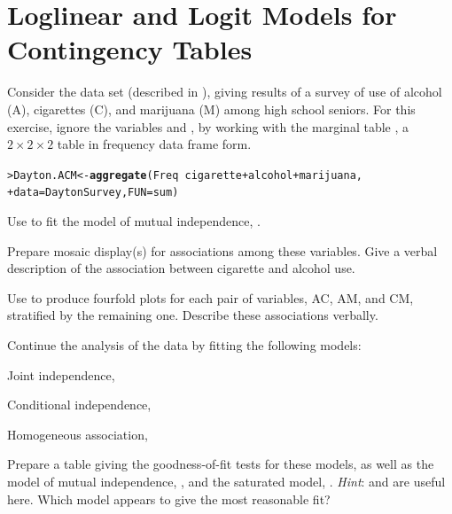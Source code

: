 \documentclass[11pt]{report}\usepackage[]{graphicx}\usepackage[]{color}
\makeatletter
\newcommand{\hlopt}[1]{\textcolor[rgb]{0,0,0}{#1}}%
\newcommand{\hlstd}[1]{\textcolor[rgb]{0.345,0.345,0.345}{#1}}%
\newcommand{\hlkwb}[1]{\textcolor[rgb]{0.69,0.353,0.396}{#1}}%
\newcommand{\hlkwc}[1]{\textcolor[rgb]{0.333,0.667,0.333}{#1}}%
\newcommand{\hlkwd}[1]{\textcolor[rgb]{0.737,0.353,0.396}{\textbf{#1}}}%
\newenvironment{kframe}{%
 \def\at@end@of@kframe{}%
 \ifinner\ifhmode%
  \def\at@end@of@kframe{\end{minipage}}%
  \begin{minipage}{\columnwidth}%
 \fi\fi%
 \def\FrameCommand##1{\hskip\@totalleftmargin \hskip-\fboxsep
 \colorbox{shadecolor}{##1}\hskip-\fboxsep
     \hskip-\linewidth \hskip-\@totalleftmargin \hskip\columnwidth}%
 \MakeFramed {\advance\hsize-\width
   \@totalleftmargin\z@ \linewidth\hsize
   \@setminipage}}%
 {\par\unskip\endMakeFramed%
 \at@end@of@kframe}
\newenvironment{knitrout}{}{} %
\renewenvironment{knitrout}{\small\renewcommand{\baselinestretch}{.85}}{} %
\makeatother
\begin{document}
\chapter{Loglinear and Logit Models for Contingency Tables}\label{ch:loglin}

\begin{Exercises}

  \exercise Consider the data set  (described in ), giving
  results of a survey of use of alcohol (A), cigarettes (C), and marijuana (M) among high school
  seniors.  For this exercise, ignore the variables  and , by working with the
  marginal table , a $2 \times 2 \times 2$ table in frequency data frame form.
\begin{knitrout}
\color{fgcolor}\begin{kframe}
\begin{alltt}
\hlstd{> }\hlstd{Dayton.ACM} \hlkwb{<-} \hlkwd{aggregate}\hlstd{(Freq} \hlopt{~} \hlstd{cigarette} \hlopt{+} \hlstd{alcohol} \hlopt{+} \hlstd{marijuana,}
\hlstd{+ }                        \hlkwc{data}\hlstd{=DaytonSurvey,} \hlkwc{FUN}\hlstd{=sum)}
\end{alltt}
\end{kframe}
\end{knitrout}
  \begin{enumerate*}
    \item Use  to fit the model of mutual independence, .
    \item Prepare mosaic display(s) for associations among these variables.
    Give a verbal description of the association between cigarette and alcohol use.
    \item Use  to produce fourfold plots for each pair of variables,
    AC, AM, and CM, stratified by the remaining one.
    Describe these associations verbally.
  \end{enumerate*}
  
  \exercise Continue the analysis of the  data by fitting the following models:
  \begin{enumerate*}
    \item Joint independence, 
    \item Conditional independence, 
    \item Homogeneous association, 
    \item Prepare a table giving the goodness-of-fit tests for these models, as well as the
    model of mutual independence, , and the saturated model, .
    \emph{Hint}:  and  are useful here.
    Which model appears to give the most reasonable fit?
  \end{enumerate*}


\end{Exercises}
\end{document}
